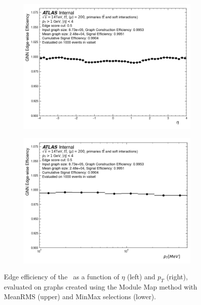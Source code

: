 \begin{figure}[h!]
\begin{subfigure}[b]{0.49\textwidth}
    \centering
    \includegraphics[width=\textwidth]{figures/gnn_MM_UNCLEANED_MEANRMS_WITHOUT_CONCAT_LATENT128_LN/edgewise_efficiency_eta.png}
    \caption{}
    \label{subfig:gnn-eff-eta-ml}
\end{subfigure}
\begin{subfigure}[b]{0.49\textwidth}
    \centering
    \includegraphics[width=\textwidth]{figures/gnn_MM_UNCLEANED_MEANRMS_WITHOUT_CONCAT_LATENT128_LN/edgewise_efficiency_pt.png}
    \caption{}
    \label{subfig:gnn-eff-pt-ml}
\end{subfigure}
\caption{Edge efficiency of the \ignn~as a function of $\eta$ (left) and $p_T$ (right), evaluated on graphs created using the Module Map method with MeanRMS (upper) and MinMax selections (lower). }
\label{fig:gnn-eff-eta-pt-meanrms-ml}
\end{figure}

